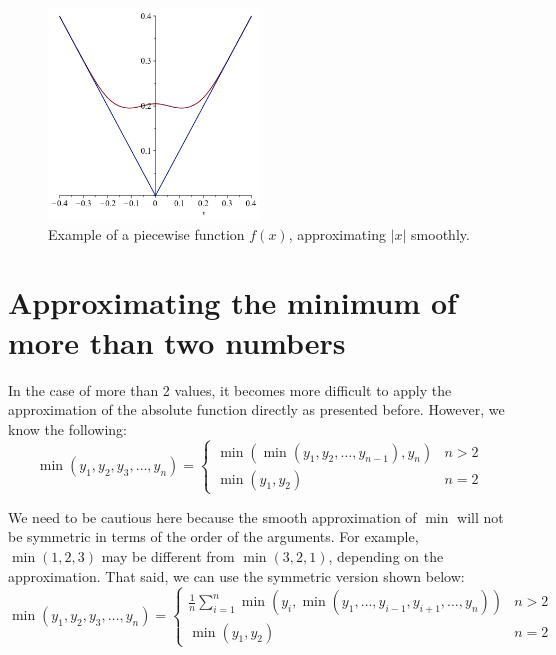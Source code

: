 \documentclass[11pt]{article}
\begin{document}
 \begin{figure}[!hbt]
    \begin{center}
      \includegraphics[width=0.5\textwidth]{example_fpiecewise}
    \end{center}
    \caption{Example of a piecewise function $f(x)$, approximating $|x|$ smoothly.}
    \label{fig:example_fpiecewise}
  \end{figure}

\section{Approximating the minimum of more than two numbers}
In the case of more than 2 values, it becomes more difficult to apply the approximation of the absolute function directly as presented before. However, we know the following:
\[
\min(y_1, y_2, y_3, \dots, y_n) = 
\begin{cases} 
      \min(\min(y_1, y_2, \dots, y_{n-1}), y_n) & n > 2 \\
      \min(y_1, y_2) & n = 2 
   \end{cases}
\]

We need to be cautious here because the smooth approximation of $\min$ will not be symmetric in terms of the order of the arguments. For example, $\min(1,2,3)$ may be different from $\min(3,2,1)$, depending on the approximation. That said, we can use the symmetric version shown below:
\[
\min(y_1, y_2, y_3, \dots, y_n) = 
\begin{cases} 
      \frac1n\sum_{i=1}^n\min(y_i, \min(y_1, \dots, y_{i-1}, y_{i+1}, \dots, y_{n})) & n > 2 \\
      \min(y_1, y_2) & n = 2 
   \end{cases}
\]
\end{document}
